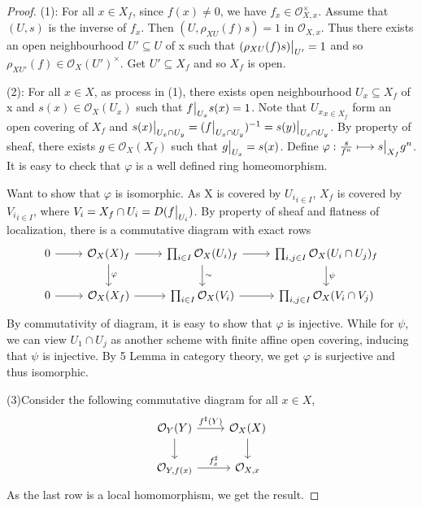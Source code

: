 \documentclass{ctexart}
\begin{document}
\begin{proof}
    (1): For all $x\in X_{f}$, since $f(x)\neq 0$, we have $f_{x}\in \mathcal{O}_{X, x}^{\times}$.
    Assume that $(U, s)$ is the inverse of $f_{x}$.
    Then $(U, \rho_{XU}(f)s) = 1$ in $\mathcal{O}_{X, x}$.
    Thus there exists an open neighbourhood $U' \subseteq U$ of x such that $(\rho_{XU}(f)s)\big{|}_{U'} = 1$ and so $\rho_{XU'}(f)\in \mathcal{O}_{X}(U')^{\times}$.
    Get $U' \subseteq X_{f}$ and so $X_{f}$ is open. 
    \par
    (2): For all $x\in X$, as process in (1), there exists open neighbourhood $U_{x} \subseteq X_{f}$ of x and $s(x)\in \mathcal{O}_{X}(U_{x})$ such that $f\big{|}_{U_{x}}s(x) = 1$.
    Note that ${U_{x}}_{x\in X_{f}}$ form an open covering of $X_{f}$ and $s(x)\big{|}_{U_{x} \cap U_{y}} = (f\big{|}_{U_{x} \cap U_{y}})^{-1} = s(y)\big{|}_{U_{x} \cap U_{y}}$.
    By property of sheaf, there exists $g\in \mathcal{O}_{X}(X_{f})$ such that $g\big{|}_{U_{x}} = s(x)$.
    Define $\varphi: \frac{s}{f^{n}} \longmapsto s\big{|}_{X_{f}}g^{n}$.
    It is easy to check that $\varphi$ is a well defined ring homeomorphism.
    \par
    Want to show that $\varphi$ is isomorphic.
    As X is covered by ${U_{i}}_{i\in I}$, $X_{f}$ is covered by ${V_{i}}_{i\in I}$, where $V_{i} = X_{f} \cap U_{i} = D(f\big{|}_{U_{i}})$.
    By property of sheaf and flatness of localization, there is a commutative diagram with exact rows
    \begin{equation*}
        \begin{tikzcd}
            0 \arrow[r] &
            \mathcal{O}_{X}(X)_{f} \arrow[r] \arrow[d, "\varphi"] &
            \prod_{i\in I} \mathcal{O}_{X}(U_{i})_{f} \arrow[r] \arrow[d, "\sim"] &
            \prod_{i,j\in I} \mathcal{O}_{X}(U_{i} \cap U_{j})_{f} \arrow[d, "\psi"] \\
            0 \arrow[r] &
            \mathcal{O}_{X}(X_{f}) \arrow[r] &
            \prod_{i\in I} \mathcal{O}_{X}(V_{i}) \arrow[r] &
            \prod_{i,j\in I} \mathcal{O}_{X}(V_{i} \cap V_{j})
        \end{tikzcd}    
    \end{equation*}
    By commutativity of diagram, it is easy to show that $\varphi$ is injective.
    While for $\psi$, we can view $U_{1} \cap U_{j}$ as another scheme with finite affine open covering, inducing that $\psi$ is injective.
    By 5 Lemma in category theory, we get $\varphi$ is surjective and thus isomorphic.
    \par
    (3)Consider the following commutative diagram for all $x\in X$,
    \begin{equation*}
        \begin{tikzcd}
            \mathcal{O}_{Y}(Y) \arrow[r, "f^{\sharp}(Y)"] \arrow[d] &
            \mathcal{O}_{X}(X) \arrow[d] \\
            \mathcal{O}_{Y, f(x)} \arrow[r, "f_{x}^{\sharp}"] &
            \mathcal{O}_{X, x}
        \end{tikzcd}
    \end{equation*}
    As the last row is a local homomorphism, we get the result.
\end{proof}
\end{document}
